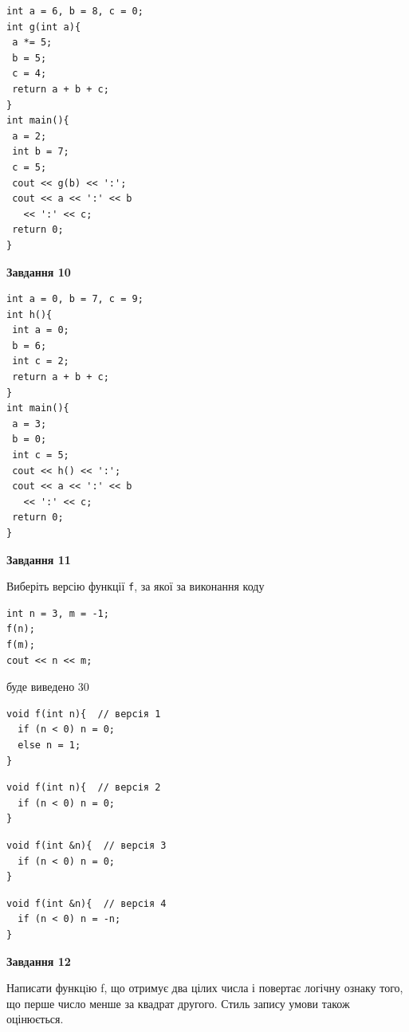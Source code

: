 \documentclass[12pt, ukrainian]{article}
\def\code#1{\Verb!#1!}
\begin{document}
{\begin {large}
\begin{minipage}[t]{7.0cm}
\begin{verbatim}
int a = 6, b = 8, c = 0;
int g(int a){
 a *= 5;
 b = 5;
 c = 4;
 return a + b + c;
}
int main(){
 a = 2;
 int b = 7;
 c = 5;
 cout << g(b) << ':';
 cout << a << ':' << b 
   << ':' << c;
 return 0;
}
\end{verbatim}



\begin{center}
\textbf{Завдання 10}
\end{center}
\vspace{-8mm}

\begin{verbatim}
int a = 0, b = 7, c = 9;
int h(){
 int a = 0;
 b = 6;
 int c = 2;
 return a + b + c;
}
int main(){
 a = 3;
 b = 0;
 int c = 5;
 cout << h() << ':';
 cout << a << ':' << b 
   << ':' << c;
 return 0;
}
\end{verbatim}

\end{minipage}
\vline \hspace{1mm}
\begin{minipage}[t]{11.0cm}

\begin{center}
\textbf{Завдання 11}
\end{center}
Виберіть версію функції \code{f}, за якої за виконання коду
\begin{verbatim}
int n = 3, m = -1;
f(n);
f(m);
cout << n << m;
\end{verbatim}

буде виведено 30

\begin{verbatim}
void f(int n){  // версія 1
  if (n < 0) n = 0;
  else n = 1;
}
\end{verbatim}

\vspace{-8mm}\begin{verbatim}
void f(int n){  // версія 2
  if (n < 0) n = 0;
}
\end{verbatim}

\vspace{-8mm}\begin{verbatim}
void f(int &n){  // версія 3
  if (n < 0) n = 0;
}
\end{verbatim}

\vspace{-8mm}\begin{verbatim}
void f(int &n){  // версія 4
  if (n < 0) n = -n;
}
\end{verbatim}



\begin{center}
\textbf{Завдання 12}
\end{center}

Написати функцiю f, що отримує два цілих числа і повертає логічну ознаку того, що перше число менше за квадрат другого. Стиль запису умови також оцінюється.\par

\end{minipage}

\end {large}}
\newpage
\end{document}
